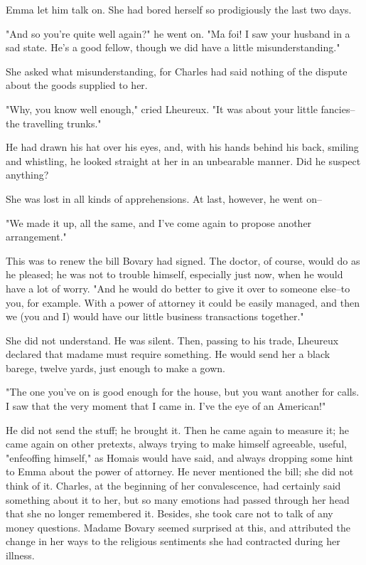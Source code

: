 \documentclass{tufte-book}
\begin{document}
Emma let him talk on. She had bored herself so prodigiously the last two
days.

"And so you're quite well again?" he went on. "Ma foi! I saw your
husband in a sad state. He's a good fellow, though we did have a little
misunderstanding."

She asked what misunderstanding, for Charles had said nothing of the
dispute about the goods supplied to her.

"Why, you know well enough," cried Lheureux. "It was about your little
fancies--the travelling trunks."

He had drawn his hat over his eyes, and, with his hands behind his
back, smiling and whistling, he looked straight at her in an unbearable
manner. Did he suspect anything?

She was lost in all kinds of apprehensions. At last, however, he went
on--

"We made it up, all the same, and I've come again to propose another
arrangement."

This was to renew the bill Bovary had signed. The doctor, of course,
would do as he pleased; he was not to trouble himself, especially just
now, when he would have a lot of worry. "And he would do better to give
it over to someone else--to you, for example. With a power of attorney
it could be easily managed, and then we (you and I) would have our
little business transactions together."

She did not understand. He was silent. Then, passing to his trade,
Lheureux declared that madame must require something. He would send her
a black barege, twelve yards, just enough to make a gown.

"The one you've on is good enough for the house, but you want another
for calls. I saw that the very moment that I came in. I've the eye of an
American!"

He did not send the stuff; he brought it. Then he came again to measure
it; he came again on other pretexts, always trying to make himself
agreeable, useful, "enfeoffing himself," as Homais would have said, and
always dropping some hint to Emma about the power of attorney. He never
mentioned the bill; she did not think of it. Charles, at the beginning
of her convalescence, had certainly said something about it to her,
but so many emotions had passed through her head that she no longer
remembered it. Besides, she took care not to talk of any money
questions. Madame Bovary seemed surprised at this, and attributed the
change in her ways to the religious sentiments she had contracted during
her illness.
\end{document}
